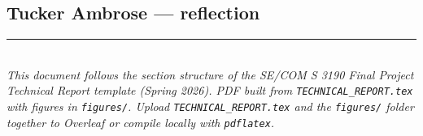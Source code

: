 \documentclass[11pt,letterpaper]{article}
\begin{document}
\subsection{Tucker Ambrose --- reflection}

\vfill
\noindent\rule{\textwidth}{0.4pt}\\[0.3em]
\small\textit{This document follows the section structure of the SE/COM S 3190 Final Project Technical Report template (Spring 2026). PDF built from \texttt{TECHNICAL\_REPORT.tex} with figures in \texttt{figures/}. Upload \texttt{TECHNICAL\_REPORT.tex} and the \texttt{figures/} folder together to Overleaf or compile locally with \texttt{pdflatex}.}
\end{document}
